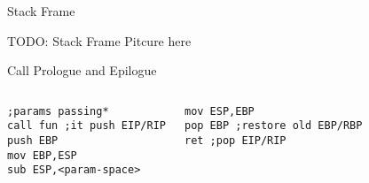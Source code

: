 \begin{frame}{Stack Frame}
\framebreak

TODO: Stack Frame Pitcure here

\framebreak

\begin{block}{Call Prologue and Epilogue}
\begin{columns}[c] 
    \acode
    \tiny
\begin{lstlisting}
;params passing*
call fun ;it push EIP/RIP
push EBP
mov EBP,ESP
sub ESP,<param-space>
\end{lstlisting}
     \acode
     \tiny
\begin{lstlisting}
mov ESP,EBP
pop EBP ;restore old EBP/RBP
ret ;pop EIP/RIP

\end{lstlisting}
\end{columns}
\end{block}


\end{frame}
